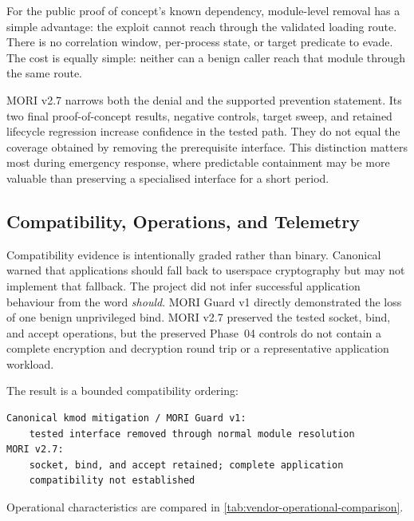 For the public proof of concept's known dependency, module-level removal has a
simple advantage: the exploit cannot reach  through the
validated loading route. There is no correlation window, per-process state, or
target predicate to evade. The cost is equally simple: neither can a benign
caller reach that module through the same route.

MORI v2.7 narrows both the denial and the supported prevention statement. Its
two final proof-of-concept results, negative controls, target sweep, and retained
lifecycle regression increase confidence in the tested path. They do not equal
the coverage obtained by removing the prerequisite interface. This distinction
matters most during emergency response, where predictable containment may be
more valuable than preserving a specialised interface for a short period.

\subsection{Compatibility, Operations, and Telemetry}

Compatibility evidence is intentionally graded rather than binary. Canonical
warned that applications should fall back to userspace cryptography but may not
implement that fallback. The project did not infer successful application
behaviour from the word \emph{should}. MORI Guard v1 directly demonstrated the
loss of one benign unprivileged  bind. MORI v2.7 preserved the
tested socket, bind, and accept operations, but the preserved Phase~04 controls
do not contain a complete encryption and decryption round trip or a
representative application workload.

The result is a bounded compatibility ordering:

\begin{lstlisting}
Canonical kmod mitigation / MORI Guard v1:
    tested interface removed through normal module resolution
MORI v2.7:
    socket, bind, and accept retained; complete application
    compatibility not established
\end{lstlisting}

Operational characteristics are compared in
\cref{tab:vendor-operational-comparison}.

